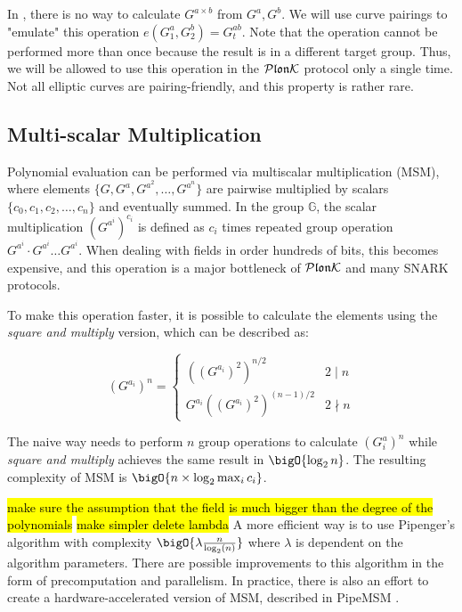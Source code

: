 In , there is no way to calculate $G^{a \times b}$ from $G^a, G^b$. We will use curve pairings to "emulate" this operation $e(G_1^a, G_2^b) = G_t^{ab}$. Note that the operation cannot be performed more than once because the result is in a different target group. Thus, we will be allowed to use this operation in the $\mathcal{P}\mathfrak{lon}\mathcal{K}$ protocol only a single time. Not all elliptic curves are pairing-friendly, and this property is rather rare.

\subsection{Multi-scalar Multiplication}
Polynomial evaluation can be performed via multiscalar multiplication (MSM), where elements $\{G, G^a, G^{a^2}, \ldots, G^{a^n}\}$ are pairwise multiplied by scalars $\{c_0, c_1, c_2, \ldots, c_n\}$ and eventually summed. In the group $\mathbb{G}$, the scalar multiplication $(G^{a^i})^{c_i}$ is defined as $c_i$ times repeated group operation $G^{a^i} \cdot G^{a^i} \ldots G^{a^i}$. When dealing with fields in order hundreds of bits, this becomes expensive, and this operation is a major bottleneck of $\mathcal{P}\mathfrak{lon}\mathcal{K}$ and many SNARK protocols.

To make this operation faster, it is possible to calculate the elements using the \textit{square and multiply} version, which can be described as:

\begin{equation*}
    (G^{a_i})^n = 
    \begin{cases}
        ((G^{a_i})^2)^{n/2} & 2 \mid n \\
        G^{a_i}((G^{a_i})^2)^{(n-1)/2} & 2 \nmid n 
    \end{cases}
\end{equation*}

The naive way needs to perform $n$ group operations to calculate $(G^a_i)^n$ while \textit{square and multiply} achieves the same result in $\bigO{\log_2{n}}$. The resulting complexity of MSM is $\bigO{n \times  \log_2{\max_i{c_i}} }$.

\hl{make sure the assumption that the field is much bigger than the degree of the polynomials}
\hl{make simpler delete lambda}
A more efficient way is to use Pipenger's algorithm \cite{Pippengers} with complexity $\bigO{\lambda\frac{n}{\log_2(n)}}$ where $\lambda$ is dependent on the algorithm parameters. There are possible improvements to this algorithm in the form of precomputation and parallelism. In practice, there is also an effort to create a hardware-accelerated version of MSM, described in PipeMSM \cite{pipeMSM}.

